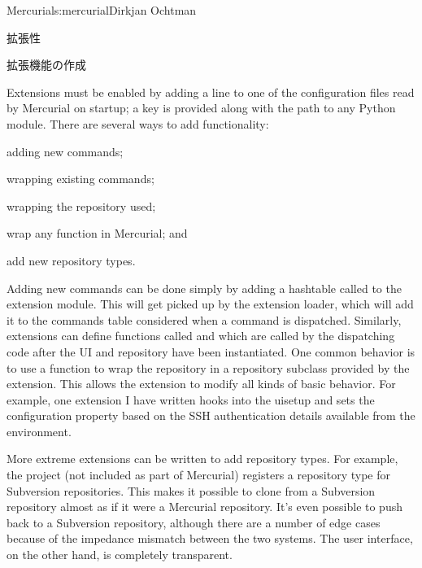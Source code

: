 \begin{aosachapter}{Mercurial}{s:mercurial}{Dirkjan Ochtman}
\begin{aosasect1}{拡張性}
\begin{aosasect2}{拡張機能の作成}

Extensions must be enabled by adding a line to one of the
configuration files read by Mercurial on startup; a key is provided
along with the path to any Python module. There are several ways to
add functionality:

\begin{aosaitemize}

  \item adding new commands;

  \item wrapping existing commands;

  \item wrapping the repository used;

  \item wrap any function in Mercurial; and

  \item add new repository types.

\end{aosaitemize}

Adding new commands can be done simply by adding a hashtable called
 to the extension module. This will get picked up by
the extension loader, which will add it to the commands table
considered when a command is dispatched. Similarly, extensions can
define functions called  and  which are
called by the dispatching code after the UI and repository have been
instantiated. One common behavior is to use a 
function to wrap the repository in a repository subclass provided by
the extension. This allows the extension to modify all kinds of basic
behavior. For example, one extension I have written hooks into the
uisetup and sets the  configuration property based on the
SSH authentication details available from the environment.

More extreme extensions can be written to add repository types. For
example, the  project (not included as part of
Mercurial) registers a repository type for Subversion
repositories. This makes it possible to clone from a Subversion
repository almost as if it were a Mercurial repository. It's even
possible to push back to a Subversion repository, although there are a
number of edge cases because of the impedance mismatch between the two
systems. The user interface, on the other hand, is completely
transparent.


\end{aosasect2}
\end{aosasect1}
\end{aosachapter}
